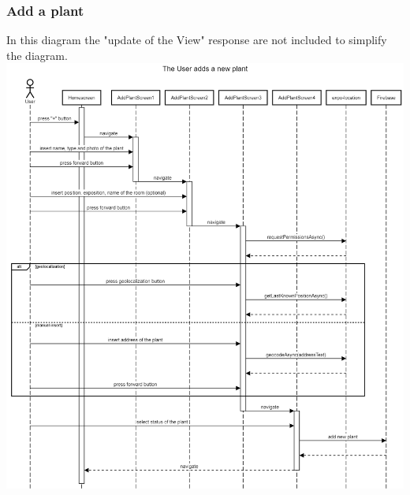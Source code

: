 \documentclass[10pt]{article}
\begin{document}
	\subsubsection{Add a plant}
	In this diagram the "update of the View" response are not included to simplify the diagram.
	\newline
	\newline
	\newline
	\includegraphics[scale=0.30]{resources/addPlant.png}
	\newpage
\end{document}
